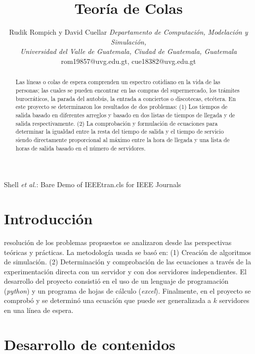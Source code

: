 \documentclass[journal]{IEEEtran}
\begin{document}
\title{Teoría de Colas}


\author{Rudik Rompich y David Cuellar \bigbreak \textit{Departamento de Computación, Modelación y Simulación,}\\ \textit{Universidad del Valle de Guatemala, Ciudad de Guatemala, Guatemala}\bigbreak 
rom19857@uvg.edu.gt, cue18382@uvg.edu.gt}%


%
{Shell \MakeLowercase{\textit{et al.}}: Bare Demo of IEEEtran.cls for IEEE Journals}


\maketitle

\begin{abstract}
	Las líneas o colas de espera comprenden un espectro cotidiano en la vida de las personas; las cuales se pueden encontrar en las compras del supermercado, los trámites burocráticos, la parada del autobús, la entrada a conciertos o discotecas, etcétera. En este proyecto se determinaron  los resultados de dos problemas: (1) Los tiempos de salida basado en diferentes arreglos y basado en dos listas de tiempos de llegada y de salida respectivamente.  (2) La comprobación y formulación de ecuaciones para determinar la igualdad entre la resta del tiempo de salida y el tiempo de servicio siendo directamente proporcional al máximo entre la hora de llegada y una lista de horas de salida basado en el número de servidores. 
\end{abstract}

\section{Introducción}

 resolución de los problemas propuestos se analizaron desde las perspectivas teóricas y prácticas. La metodología usada se basó en: (1) Creación de algoritmos de simulación. (2) Determinación y comprobación de las ecuaciones a través de la experimentación directa con un servidor y con dos servidores independientes. El desarrollo del proyecto consistió en el uso de un lenguaje de programación (\textit{python}) y un programa de hojas de cálculo (\textit{excel}). Finalmente, en el proyecto se comprobó y se determinó una ecuación que puede ser generalizada a $k$ servidores en una línea de espera. 

\section{Desarrollo de contenidos}
\end{document}
